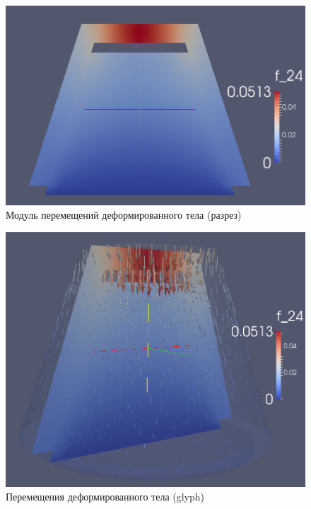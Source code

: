\documentclass[a4paper, 14pt]{extreport}
\begin{document}
\begin{figure}[H]
	\center
	\includegraphics[scale=0.4]{pictures/result_push_displacement_slice.png}
	\caption{Модуль перемещений деформированного тела (разрез)}
	\label{fig: result_push_displacement_slice}
\end{figure}

\begin{figure}[H]
	\center
	\includegraphics[scale=0.5]{pictures/result_push_displacement_glyph.png}
	\caption{Перемещения деформированного тела (glyph)}
	\label{fig: result_push_displacement_glyph}
\end{figure}
\end{document}
